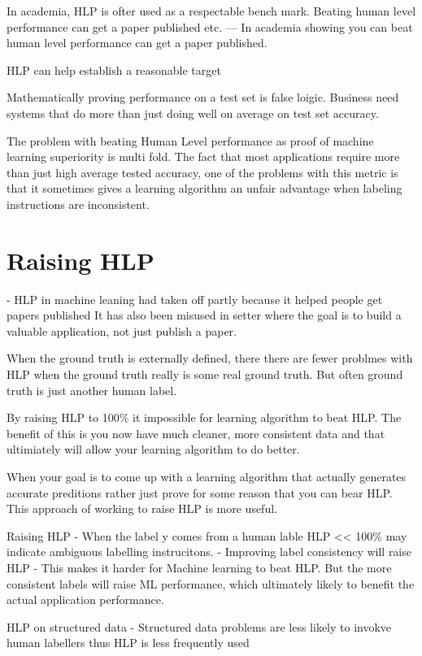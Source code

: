 In academia, HLP is ofter used as a respectable bench mark. Beating human level performance can get a paper published etc.
--- In academia showing you can beat human level performance can get a paper published.

HLP can help establish a reasonable target


Mathematically proving performance on a test set is false loigic. Business need systems that do more than just doing well on average on test set accuracy.

The problem with beating Human Level performance as proof of machine learning superiority is multi fold.
The fact that most applications require more than just high average tested accuracy, one of the problems with this metric is that it sometimes gives a learning algorithm an unfair advantage when labeling instructions are inconsistent.

\section{Raising HLP}

- HLP in machine leaning had taken off partly because it helped people get papers published %
It has also been misused in setter where the goal is to build a valuable application, not just publish a paper.

When the ground truth is externally defined, there there are fewer problmes with HLP when the ground truth really is some real ground truth.
But often ground truth is just another human label.

By raising HLP to 100\% it impossible for learning algorithm to beat HLP.
The benefit of this is you now have much cleaner, more consistent data and that ultimiately will allow your learning algorithm to do better.

When your goal is to come up with a learning algorithm that actually generates accurate preditions rather just prove for some reason that you can bear HLP.
This approach of working to raise HLP is more useful.

Raising HLP
- When the label y comes from a human lable HLP << 100\% may indicate ambiguous labelling instrucitons.
- Improving label consistency will raise HLP
- This makes  it harder for Machine learning to beat HLP. But the more consistent labels will raise ML performance, which ultimately likely to benefit the actual application performance.


HLP on structured data
- Structured data problems are less likely to invokve human labellers thus HLP is less frequently used

